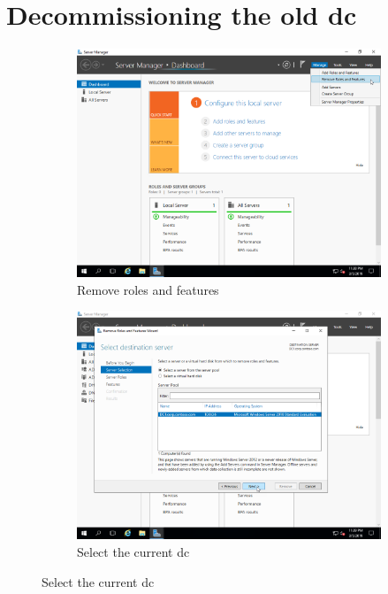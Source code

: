\section{Decommissioning the old \acrshort{dc}}
\begin{figure}[!htb]
	\begin{subfigure}{0.5\textwidth}
		\captionsetup{width=0.8\linewidth}
		\includegraphics[width=0.9\linewidth]{img/Methodologie/Migration29.png}
		\centering
		\caption{Remove roles and features}
	\end{subfigure}
	\begin{subfigure}{0.5\textwidth}
		\captionsetup{width=0.8\linewidth}
		\includegraphics[width=0.9\linewidth]{img/Methodologie/Migration30.png} 
		\centering
		\caption{Select the current \acrshort{dc}}
	\end{subfigure}
\end{figure}

